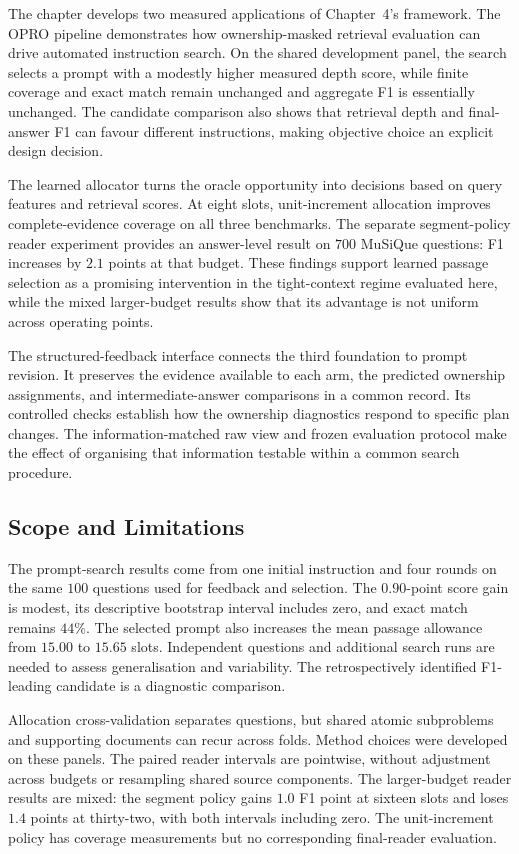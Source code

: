 The chapter develops two measured applications of Chapter~4's framework.
The OPRO pipeline demonstrates how ownership-masked retrieval evaluation can
drive automated instruction search. On the shared development panel, the search selects a prompt with a modestly higher measured depth score, while finite coverage and exact match remain unchanged and aggregate F1 is essentially unchanged. The
candidate comparison also shows that retrieval depth and final-answer F1
can favour different instructions, making objective choice an explicit
design decision.

The learned allocator turns the oracle opportunity into decisions based on
query features and retrieval scores. At eight slots, unit-increment allocation
improves complete-evidence coverage on all three benchmarks. The separate
segment-policy reader experiment provides an answer-level result on $700$
MuSiQue questions: F1 increases by $2.1$ points at that budget. These findings support learned passage selection as a promising intervention in the tight-context regime evaluated here, while the mixed larger-budget results show that its advantage is not uniform across operating points.

The structured-feedback interface connects the third foundation to prompt
revision. It preserves the evidence available to each arm, the predicted
ownership assignments, and intermediate-answer comparisons in a common
record. Its controlled checks establish how the ownership diagnostics respond
to specific plan changes. The information-matched raw view and frozen
evaluation protocol make the effect of organising that information testable
within a common search procedure.

\subsection{Scope and Limitations}
\label{sec:ch5-limitations}

The prompt-search results come from one initial instruction and four rounds
on the same $100$ questions used for feedback and selection. The $0.90$-point
score gain is modest, its descriptive bootstrap interval includes zero, and
exact match remains $44\%$. The selected prompt also increases the mean
passage allowance from $15.00$ to $15.65$ slots. Independent questions and
additional search runs are needed to assess generalisation and variability.
The retrospectively identified F1-leading candidate is a diagnostic comparison.

Allocation cross-validation separates questions, but shared atomic
subproblems and supporting documents can recur across folds. Method choices
were developed on these panels. The paired reader intervals are pointwise,
without adjustment across budgets or resampling shared source components.
The larger-budget reader results are mixed: the segment policy gains
$1.0$ F1 point at sixteen slots and loses $1.4$ points at thirty-two, with
both intervals including zero. The unit-increment policy has coverage
measurements but no corresponding final-reader evaluation.

